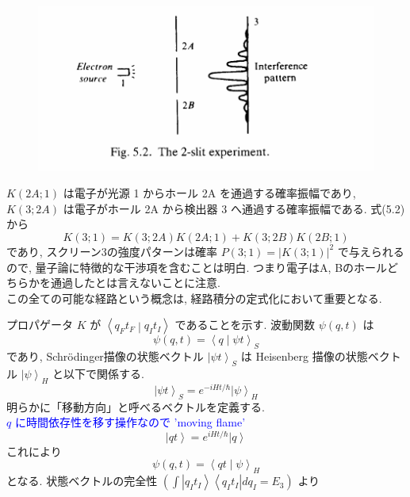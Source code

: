 \documentclass[a4paper,12pt]{article}
\newcommand{\bra}[1]{\left\langle #1\right|}
\newcommand{\ket}[1]{\left|#1\right\rangle}
\newcommand{\braket}[2]{\left\langle #1\middle|#2\right\rangle}
\begin{document}
\begin{figure}[H]
    \centering
    \includegraphics[width=13cm]{figure/fig5-2.png}
\end{figure}

$K(2A; 1)$ は電子が光源 1 からホール 2A を通過する確率振幅であり, $K(3; 2A)$ は電子がホール 2A から検出器 3 へ通過する確率振幅である. 式(5.2)から
\begin{equation*}
    K(3; 1) = K(3; 2A)K(2A; 1) + K(3; 2B)K(2B; 1)
\end{equation*}
であり, スクリーン3の強度パターンは確率 $P(3; 1) = |K(3; 1)|^2$ で与えられるので, 量子論に特徴的な干渉項を含むことは明白. つまり電子はA, Bのホールどちらかを通過したとは言えないことに注意.\\
この全ての可能な経路という概念は, 経路積分の定式化において重要となる.\par
プロパゲータ $K$ が $\braket{q_{F}t_{F}}{q_{I}t_{I}}$ であることを示す. 波動関数 $\psi(q, t)$ は\\
\begin{equation*}
    \psi(q, t) = \braket{q}{\psi t}_{S}
\end{equation*}
であり, Schr\"{o}dinger描像の状態ベクトル $\ket{\psi t}_{S}$ は Heisenberg 描像の状態ベクトル $\ket{\psi}_{H}$ と以下で関係する.
\begin{equation*}
    \ket{\psi t}_{S} = e^{-iHt/\hbar}\ket{\psi}_{H}
\end{equation*}
明らかに「移動方向」と呼べるベクトルを定義する.\\
\textcolor{blue}{$q$ に時間依存性を移す操作なので 'moving flame'}
\begin{equation*}
    \ket{qt} = e^{iHt/\hbar}\ket{q} \tag{5.3}
\end{equation*}
これにより
\begin{equation*}
    \psi(q, t) = \braket{qt}{\psi}_{H} \tag{5.4}
\end{equation*}
となる. 状態ベクトルの完全性 $\displaystyle \left( \int \ket{q_I t_I}\bra{q_I t_I}dq_I = E_3 \right) $ より
\end{document}
